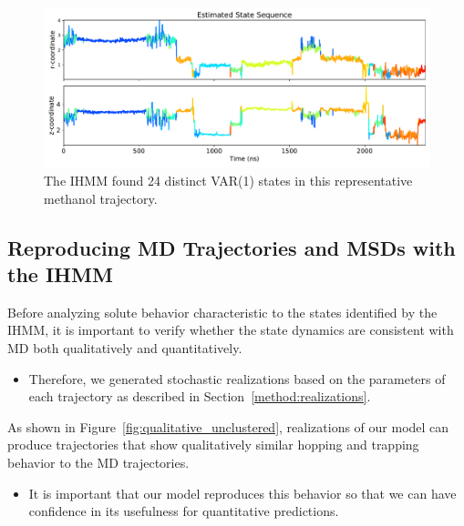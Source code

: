 \documentclass[journal=jpcbfk,manuscript=article]{achemso}
\begin{document}
  \begin{figure}
  \centering
  \includegraphics[width=\textwidth]{rz_unclustered_MET.pdf}
  \caption{The IHMM found 24 distinct VAR(1) states in this representative methanol trajectory.}\label{fig:rz_unclustered}
  \end{figure}
  
  \subsection{Reproducing MD Trajectories and MSDs with the IHMM}

  
  Before analyzing solute behavior characteristic to the states identified by the
  IHMM, it is important to verify whether the state dynamics are consistent with MD
  both qualitatively and quantitatively.
  \begin{itemize}
    \item Therefore, we generated stochastic realizations based on the parameters 
    of each trajectory as described in Section~\ref{method:realizations}.
  \end{itemize}
  
  As shown in Figure~\ref{fig:qualitative_unclustered}, realizations of our model 
  can produce trajectories that show qualitatively similar hopping and trapping 
  behavior to the MD trajectories.
  \begin{itemize}
    \item It is important that our model reproduces this behavior so that we can
    have confidence in its usefulness for quantitative predictions.
  \end{itemize}
  
\end{document}
